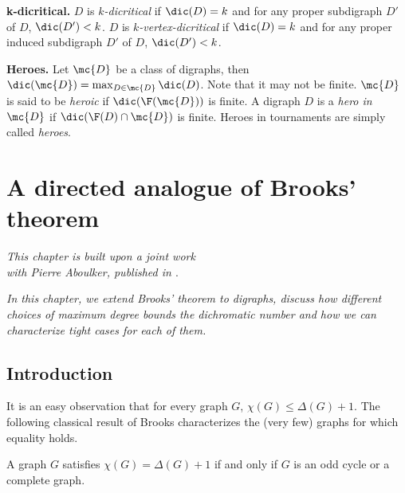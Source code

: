 \medskip

\textbf{k-dicritical.}
$D$ is \emph{$k$-dicritical} if $\dic(D) = k$ and for any proper subdigraph $D'$ of $D$, $\dic(D') < k$.
$D$ is \emph{$k$-vertex-dicritical} if $\dic(D) = k$ and for any proper induced subdigraph $D'$ of $D$, $\dic(D') < k$.

\medskip

\textbf{Heroes.}
Let $\mc{D}$ be a class of digraphs, then $\dic(\mc{D}) = \max_{D \in \mc{D}} \dic(D)$. Note that it may not be finite.
$\mc{D}$ is said to be \emph{heroic} if $\dic(\F(\mc{D}))$ is finite. A digraph $D$ is a \emph{hero in $\mc{D}$} if $\dic(\F(D) \cap \mc{D})$ is finite. Heroes in tournaments are simply called \emph{heroes}.



\chapter{A directed analogue of Brooks' theorem}\label{chpt:brooks}

\begin{flushright}{\slshape    
This chapter is built upon a joint work \\
with Pierre Aboulker, published in \cite{AA22}}. \\ \medskip
\end{flushright}

\emph{In this chapter, we extend Brooks' theorem to digraphs, discuss how different choices of maximum degree bounds the dichromatic number and how we can characterize tight cases for each of them.}

\section{Introduction}
It is an easy observation that for every graph $G$, $\chi(G) \leq \Delta(G)+1$. The following classical result of Brooks characterizes the (very few) graphs for which equality holds. 
\begin{theorem}
A graph $G$ satisfies $\chi(G) = \Delta(G) + 1$ if and only if $G$ is an odd cycle or a complete graph. 
\end{theorem}

